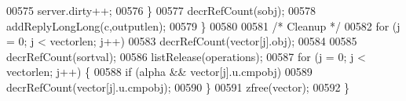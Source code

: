 \begin{DoxyCode}
00575             server.dirty++;
00576         \}
00577         decrRefCount(sobj);
00578         addReplyLongLong(c,outputlen);
00579     \}
00580 
00581     \textcolor{comment}{/* Cleanup */}
00582     \textcolor{keywordflow}{for} (j = 0; j < vectorlen; j++)
00583         decrRefCount(vector[j].obj);
00584 
00585     decrRefCount(sortval);
00586     listRelease(operations);
00587     \textcolor{keywordflow}{for} (j = 0; j < vectorlen; j++) \{
00588         \textcolor{keywordflow}{if} (alpha && vector[j].u.cmpobj)
00589             decrRefCount(vector[j].u.cmpobj);
00590     \}
00591     zfree(vector);
00592 \}
\end{DoxyCode}
